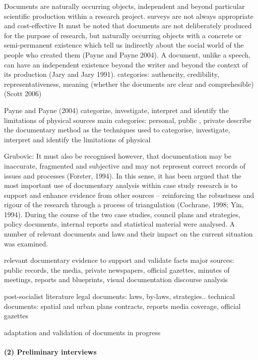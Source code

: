 \documentclass[11pt]{report}
\begin{document}
Documents are naturally occurring objects, independent and beyond particular scientific production within a research project.
surveys are not always appropriate and cost-effective
It must be noted that documents are not deliberately produced for
the purpose of research, but naturally occurring objects with a concrete or
semi-permanent existence which tell us indirectly about the social world of the
people who created them (Payne and Payne 2004). A document, unlike a
speech, can have an independent existence beyond the writer and beyond the
context of its production (Jary and Jary 1991).
categories: authencity, credibility, representativeness, meaning (whether the documents are clear and comprehesible) (Scott 2006)

Payne and Payne (2004)
categorize, investigate, interpret and identify the limitations of physical sources
main categories: personal, public , private
describe the documentary method as the techniques used to
categorise, investigate, interpret and identify the limitations of physical

Grubovic:  It  must  also  be  recognised  however,  that documentation may be inaccurate, fragmented and subjective and may not represent correct  records  of  issues  and  processes  (Forster,  1994).  In  this  sense,  it  has  been 
argued  that  the  most  important  use  of  documentary  analysis  within  case  study research  is  to  support  and  enhance  evidence  from  other  sources  –  reinforcing  the robustness and rigour of the research through a process of triangulation (Cochrane, 1998;  Yin,  1994).  During  the  course  of  the  two  case  studies,  council  plans  and strategies, policy documents, internal reports and statistical material were analysed.  A number of relevant documents and laws and their impact on the current situation was examined.

relevant documentary evidence to support and validate facts
major sources: public records, the media, private newspapers, official gazettes, minutes of meetings, reports and blueprints, visual documentation
discourse analysis

post-socialist literature
legal documents: laws, by-laws, strategies..
technical documents: spatial and urban plans
contracts, reports
media coverage, official gazettes

adaptation and validation of documents in progress

\paragraph{(2) Preliminary interviews}
\end{document}
